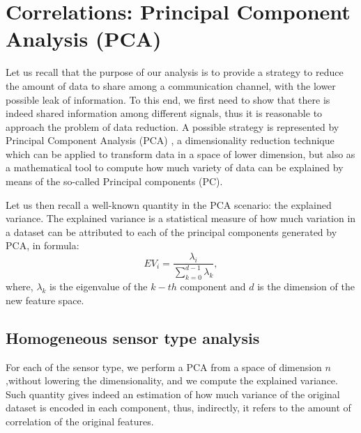 \documentclass[10pt, a4paper, twocolumn]{article}
\theoremstyle{definition}
\begin{document}
\section{Correlations: Principal Component Analysis (PCA)}
Let us recall that the purpose of our analysis is to provide a strategy to reduce the amount of data to share among a communication channel, with the lower possible leak of information. To this end, we first need to show that there is indeed shared information among different signals, thus it is reasonable to approach the problem of data reduction. A possible strategy is represented by Principal Component Analysis (PCA) \cite{Jolliffe2011}, a dimensionality reduction technique which can be applied to transform data in a space of lower dimension, but also as a mathematical tool to compute how much variety of data can be explained by means of the so-called Principal components (PC). \par
Let us then recall a well-known quantity in the PCA scenario: the explained variance. The explained variance is a statistical measure of how much variation in a dataset can be attributed to each of the principal components generated by PCA, in formula:
\begin{equation}
EV_i = \frac{\lambda_i}{\sum_{k=0}^{d-1}\lambda_k} ,
\end{equation}
where, $\lambda_k$ is the eigenvalue of the $k-th$ component and $d$ is the dimension of the new feature space.

\subsection{Homogeneous sensor type analysis}

For each of the sensor type, we perform a PCA \cite{sklearn_api} from a space of dimension $n$ ,without lowering the dimensionality, and we compute the explained variance. Such quantity gives indeed an estimation of how much variance of the original dataset is encoded in each component, thus, indirectly, it refers to the amount of correlation of the original features. 
\end{document}
